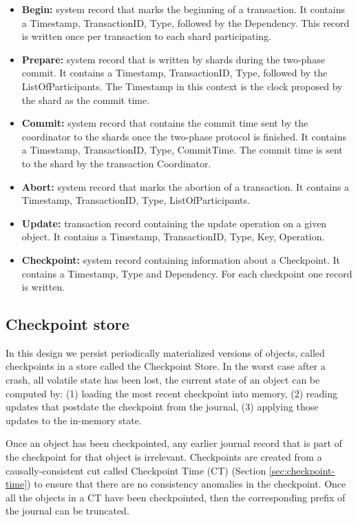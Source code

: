 \documentclass[twoside]{article}
\begin{document}
\begin{itemize}
\item \textbf{Begin:} system record that marks the beginning of a
transaction. 
It contains a Timestamp, TransactionID, Type, followed by the Dependency.
This record is written once per transaction to each shard
participating.
\item \textbf{Prepare:} system record that is written by shards during the two-phase commit. 
It contains a Timestamp, TransactionID, Type, followed by the ListOfParticipants.
The Timestamp in this context is the clock proposed by the shard as the commit time.
\item \textbf{Commit:} system record that contains the commit time sent by the coordinator
to the shards once the two-phase protocol is finished.
It contains a Timestamp, TransactionID, Type, CommitTime.
The commit time is sent to the shard by the transaction Coordinator.
\item \textbf{Abort:} system record that marks the abortion of a transaction.
It contains a Timestamp, TransactionID, Type, ListOfParticipants.
\item \textbf{Update:} transaction record containing the update operation on a given
object.
It contains a Timestamp, TransactionID, Type, Key, Operation.
\item \textbf{Checkpoint:} system record containing information about a Checkpoint.
It contains a Timestamp, Type and Dependency. 
For each checkpoint one record is written.
\end{itemize}


\subsection{Checkpoint store}
\label{sec:checkpoint-store}

In this design we persist periodically materialized versions of objects, called
checkpoints in a store called the Checkpoint Store.  
In the worst case after a crash, all volatile state has been lost, the current
state of an object can be computed by: (1) loading the most recent checkpoint
into memory, (2) reading updates that postdate the checkpoint from the journal,
(3) applying those updates to the in-memory state.

Once an object has been checkpointed, any earlier journal record that is part of 
the checkpoint for that object is irrelevant. 
Checkpoints are created from a causally-consistent cut called Checkpoint Time
(CT) (Section \ref{sec:checkpoint-time}) to ensure that there are no consistency
anomalies in the checkpoint.
Once all the objects in a CT have been checkpointed, then the corresponding
prefix of the journal can be truncated.
\end{document}
